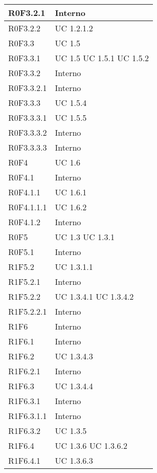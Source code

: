\begin{center}
\begin{longtable}{| p{4cm} | p{4cm} |}
		\hline
		R0F3.2.1  &  Interno \\
		\hline
		R0F3.2.2  &  UC 1.2.1.2 \\
		\hline
		R0F3.3  &  UC 1.5 \\
		\hline
		R0F3.3.1  &  UC 1.5 \newline UC 1.5.1 \newline UC 1.5.2 \\
		\hline
		R0F3.3.2  &  Interno \\
		\hline
		R0F3.3.2.1  &  Interno \\
		\hline
		R0F3.3.3  &  UC 1.5.4 \\
		\hline
		R0F3.3.3.1  &  UC 1.5.5 \\
		\hline
		R0F3.3.3.2  &  Interno \\
		\hline
		R0F3.3.3.3  &  Interno \\
		\hline
		R0F4  &  UC 1.6 \\
		\hline
		R0F4.1  &  Interno \\
		\hline
		R0F4.1.1  &  UC 1.6.1 \\
		\hline
		R0F4.1.1.1  &  UC 1.6.2 \\
		\hline
		R0F4.1.2  &  Interno \\
		\hline
		R0F5  &  UC 1.3 \newline UC 1.3.1 \\
		\hline
		R0F5.1  &  Interno \\
		\hline
		R1F5.2  &  UC 1.3.1.1 \\
		\hline
		R1F5.2.1  &  Interno \\
		\hline
		R1F5.2.2  &  UC 1.3.4.1 \newline UC 1.3.4.2 \\
		\hline
		R1F5.2.2.1  &  Interno \\
		\hline
		R1F6  &  Interno \\
		\hline
		R1F6.1  &  Interno \\
		\hline
		R1F6.2  &  UC 1.3.4.3 \\
		\hline
		R1F6.2.1  &  Interno \\
		\hline
		R1F6.3  &  UC 1.3.4.4 \\
		\hline
		R1F6.3.1  &  Interno \\
		\hline
		R1F6.3.1.1  &  Interno \\
		\hline
		R1F6.3.2  &  UC 1.3.5 \\
		\hline
		R1F6.4  &  UC 1.3.6 \newline UC 1.3.6.2 \\
		\hline
		R1F6.4.1  &  UC 1.3.6.3 \\

\end{longtable}
\end{center}
